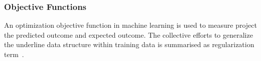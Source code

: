 \subsubsection{Objective Functions}
An optimization objective function in machine learning is used to measure project the predicted outcome and expected outcome. The collective efforts to generalize the underline data structure within training data is summarised as regularization term~\cite{goodfellow_2015}.  